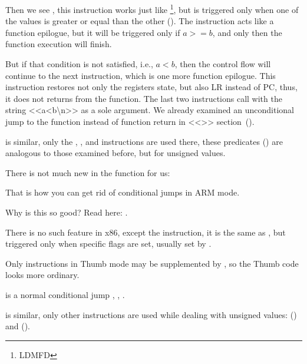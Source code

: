 
Then we see , this instruction works just like \footnote{\ac{LDMFD}},
but is triggered only when one of the values is greater or equal than the other ().
The  instruction acts like a function epilogue, but it will be triggered only if $a>=b$, and only then the function execution will finish.


But if that condition is not satisfied, i.e., $a<b$, then the control flow will continue to the next  instruction, which is one more function epilogue. This instruction restores not only the  registers state, but also \ac{LR} instead of \ac{PC}, thus, it does not returns from the function.
The last two instructions call \printf with the string <<a<b\textbackslash{}n>> as a sole argument.
We already examined an unconditional jump to the \printf function instead of function return in <<\PrintfSeveralArgumentsSectionName>> section~().

 is similar, only the , , and  instructions are used there, these predicates () are analogous to those examined before, but for unsigned values.

There is not much new in the \main function for us:



That is how you can get rid of conditional jumps in ARM mode.

Why is this so good? Read here: .


There is no such feature in x86, except the  instruction, it is the same as \MOV,
but triggered only when specific flags are set, usually set by \CMP.

\myparagraphold{\OptimizingKeilVI (\ThumbMode)}




Only  instructions in Thumb mode may be supplemented by , so the Thumb code 
looks more ordinary.

 is a normal conditional jump , 
\EMDASH{}, 
\EMDASH{}.

 is similar, only other instructions are used while dealing 
with unsigned values:  
() and  ().

